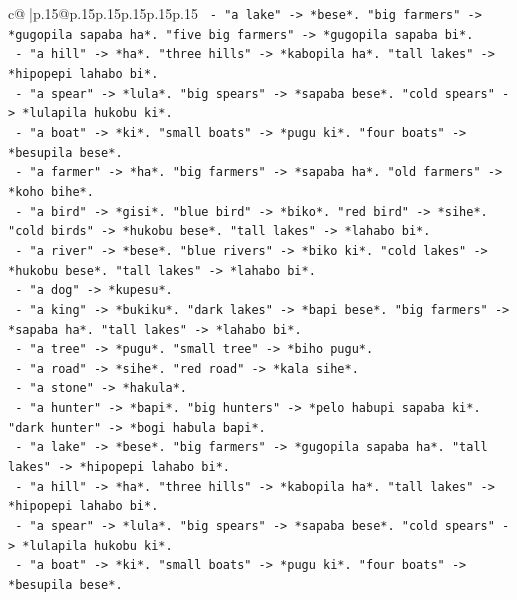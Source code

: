 \documentclass{article}
\begin{document}
{\begin{supertabular}{c@{$\;$}|p{.15\linewidth}@{}p{.15\linewidth}p{.15\linewidth}p{.15\linewidth}p{.15\linewidth}p{.15\linewidth}}
{{{\texttt{            {-} "a lake" {-}> *bese*. "big farmers" {-}> *gugopila sapaba ha*. "five big farmers" {-}> *gugopila sapaba bi*.} \\
\texttt{            {-} "a hill" {-}> *ha*. "three hills" {-}> *kabopila ha*. "tall lakes" {-}> *hipopepi lahabo bi*.} \\
\texttt{            {-} "a spear" {-}> *lula*. "big spears" {-}> *sapaba bese*. "cold spears" {-}> *lulapila hukobu ki*.} \\
\texttt{            {-} "a boat" {-}> *ki*. "small boats" {-}> *pugu ki*. "four boats" {-}> *besupila bese*.} \\
\texttt{            {-} "a farmer" {-}> *ha*. "big farmers" {-}> *sapaba ha*. "old farmers" {-}> *koho bihe*.} \\
\texttt{            {-} "a bird" {-}> *gisi*. "blue bird" {-}> *biko*. "red bird" {-}> *sihe*. "cold birds" {-}> *hukobu bese*. "tall lakes" {-}> *lahabo bi*.} \\
\texttt{            {-} "a river" {-}> *bese*. "blue rivers" {-}> *biko ki*. "cold lakes" {-}> *hukobu bese*. "tall lakes" {-}> *lahabo bi*.} \\
\texttt{            {-} "a dog" {-}> *kupesu*.} \\
\texttt{            {-} "a king" {-}> *bukiku*. "dark lakes" {-}> *bapi bese*. "big farmers" {-}> *sapaba ha*. "tall lakes" {-}> *lahabo bi*.} \\
\texttt{            {-} "a tree" {-}> *pugu*. "small tree" {-}> *biho pugu*.} \\
\texttt{            {-} "a road" {-}> *sihe*. "red road" {-}> *kala sihe*.} \\
\texttt{            {-} "a stone" {-}> *hakula*.} \\
\texttt{            {-} "a hunter" {-}> *bapi*. "big hunters" {-}> *pelo habupi sapaba ki*. "dark hunter" {-}> *bogi habula bapi*.} \\
\texttt{            {-} "a lake" {-}> *bese*. "big farmers" {-}> *gugopila sapaba ha*. "tall lakes" {-}> *hipopepi lahabo bi*.} \\
\texttt{            {-} "a hill" {-}> *ha*. "three hills" {-}> *kabopila ha*. "tall lakes" {-}> *hipopepi lahabo bi*.} \\
\texttt{            {-} "a spear" {-}> *lula*. "big spears" {-}> *sapaba bese*. "cold spears" {-}> *lulapila hukobu ki*.} \\
\texttt{            {-} "a boat" {-}> *ki*. "small boats" {-}> *pugu ki*. "four boats" {-}> *besupila bese*.} \\
}}}
\end{supertabular}}
\end{document}

